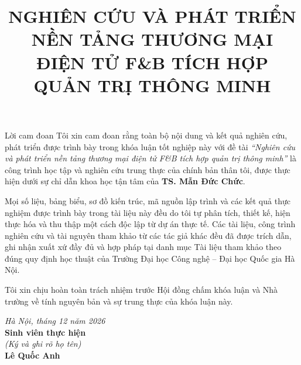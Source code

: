 \documentclass{uetgraduation}
\begin{document}
\title{NGHIÊN CỨU VÀ PHÁT TRIỂN NỀN TẢNG THƯƠNG MẠI ĐIỆN TỬ F\&B TÍCH HỢP QUẢN TRỊ THÔNG MINH}


\makecovers

\begin{preamble}{Lời cam đoan}
Tôi xin cam đoan rằng toàn bộ nội dung và kết quả nghiên cứu, phát triển được trình bày trong khóa luận tốt nghiệp này với đề tài \textit{``Nghiên cứu và phát triển nền tảng thương mại điện tử F\&B tích hợp quản trị thông minh''} là công trình học tập và nghiên cứu trung thực của chính bản thân tôi, được thực hiện dưới sự chỉ dẫn khoa học tận tâm của \textbf{TS. Mẫn Đức Chức}.

Mọi số liệu, bảng biểu, sơ đồ kiến trúc, mã nguồn lập trình và các kết quả thực nghiệm được trình bày trong tài liệu này đều do tôi tự phân tích, thiết kế, hiện thực hóa và thu thập một cách độc lập từ dự án thực tế. Các tài liệu, công trình nghiên cứu và tài nguyên tham khảo từ các tác giả khác đều đã được trích dẫn, ghi nhận xuất xứ đầy đủ và hợp pháp tại danh mục Tài liệu tham khảo theo đúng quy định học thuật của Trường Đại học Công nghệ -- Đại học Quốc gia Hà Nội.

Tôi xin chịu hoàn toàn trách nhiệm trước Hội đồng chấm khóa luận và Nhà trường về tính nguyên bản và sự trung thực của khóa luận này.

\vspace{1.5cm}
\begin{flushright}
\textit{Hà Nội, tháng 12 năm 2026}\\
\textbf{Sinh viên thực hiện}\\
\textit{(Ký và ghi rõ họ tên)}\\
\vspace{1.5cm}
\textbf{Lê Quốc Anh}
\end{flushright}
\end{preamble}
\end{document}
